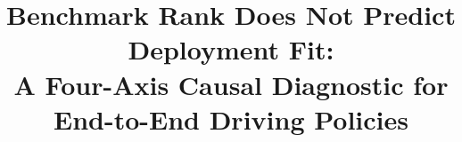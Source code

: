 \documentclass[conference]{IEEEtran}
\begin{document}
\title{Benchmark Rank Does Not Predict Deployment Fit:\\
A Four-Axis Causal Diagnostic for End-to-End Driving Policies}

\author{
}

\maketitle

\nocite{*}










\appendix

\end{document}
